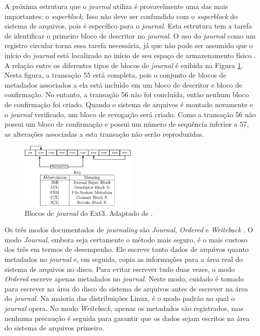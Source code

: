 \documentclass[
	12pt,				%
	openright,			%
	oneside,			%
	a4paper,			%
	chapter=TITLE,		%
	english,			%
	french,				%
	spanish,			%
	brazil				%
	]{abntex2}
\theoremstyle{definition}
\begin{document}
A próxima estrutura que o \textit{journal} utiliza é provavelmente uma das mais 
importantes: o \textit{superblock}. Isso não deve ser confundido com o 
\textit{superblock} do sistema de arquivos, pois é específico para o \textit{journal}. 
Esta estrutura tem a tarefa de identificar o primeiro bloco de descritor no \textit{journal}. 
O uso do \textit{journal} como um registro circular torna essa tarefa necessária, já 
que não pode ser assumido que o início do \textit{journal} está localizado no início de 
seu espaço de armazenamento físico \cite{carrier2005file}. A relação entre os diferentes 
tipos de blocos de \textit{journal} é exibida na Figura \ref{fig:ext3_joual_blocks}. Nesta figura, a transação 55 
está completa, pois o conjunto de blocos de metadados associados a ela está incluído em 
um bloco de descritor e bloco de confirmação. No entanto, a transação 56 não foi concluída, 
então nenhum bloco de confirmação foi criado. Quando o sistema de arquivos é montado 
novamente e o \textit{journal} verificado, um bloco de revogação será criado. Como a 
transação 56 não possui um bloco de confirmação e possui um número de sequência inferior 
a 57, as alterações associadas a esta transação não serão reproduzidas.

\begin{figure}[h]
    \centering
    \includegraphics[width=0.5\textwidth]{journalingf.jpg}
    \caption{Blocos de \textit{journal} do Ext3. Adaptado de \cite{carrier2005file}.}
    \label{fig:ext3_joual_blocks}
\end{figure}

Os três modos documentados de \textit{journaling} são \textit{Journal}, \textit{Ordered} e 
\textit{Writeback} \cite{bovet_cesati_2005}. O modo \textit{Journal}, embora seja certamente 
o método mais seguro, é o mais custoso dos três em termos de desempenho. Ele escreve tanto dados 
de arquivos quanto metadados no \textit{journal} e, em seguida, copia as informações para a área real do sistema de arquivos no disco. Para evitar escrever tudo duas vezes, o modo \textit{Ordered} escreve apenas metadados no \textit{journal}. Neste modo, cuidado é tomado para escrever na área do disco do sistema de arquivos antes de escrever na área do \textit{journal}. Na maioria das distribuições Linux, é o modo padrão no qual o \textit{journal} opera. No modo \textit{Writeback}, apenas os metadados são registrados, mas nenhuma precaução é seguida para garantir que os dados sejam escritos na área do sistema de arquivos primeiro.
\end{document}
